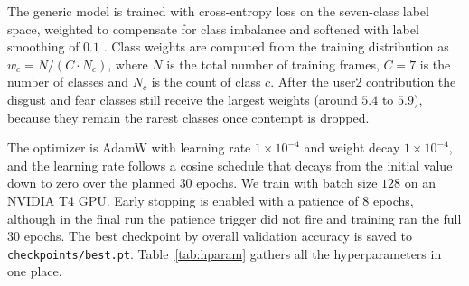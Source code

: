 The generic model is trained with cross-entropy loss on the seven-class label space, weighted to compensate for class imbalance and softened with label smoothing of $0.1$ \autocite{szegedy2016rethinking}. Class weights are computed from the training distribution as $w_c = N / (C\cdot N_c)$, where $N$ is the total number of training frames, $C=7$ is the number of classes and $N_c$ is the count of class $c$. After the user2 contribution the disgust and fear classes still receive the largest weights (around $5.4$ to $5.9$), because they remain the rarest classes once contempt is dropped.

The optimizer is AdamW \autocite{loshchilov2019adamw} with learning rate $1\times 10^{-4}$ and weight decay $1\times 10^{-4}$, and the learning rate follows a cosine schedule that decays from the initial value down to zero over the planned $30$ epochs. We train with batch size $128$ on an NVIDIA T4 GPU. Early stopping is enabled with a patience of $8$ epochs, although in the final run the patience trigger did not fire and training ran the full $30$ epochs. The best checkpoint by overall validation accuracy is saved to \texttt{checkpoints/best.pt}. Table~\ref{tab:hparam} gathers all the hyperparameters in one place.

